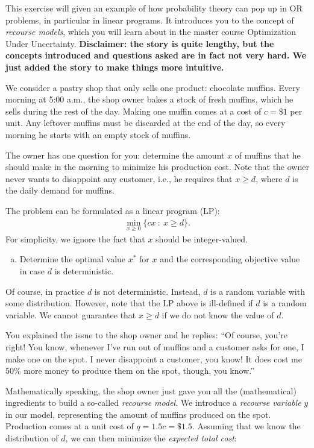 \documentclass[assignments]{subfiles}
\begin{document}
\begin{exercise}

This exercise will given an example of how probability theory can pop up in OR problems, in particular in linear programs. It introduces you to the concept of \textit{recourse models}, which you will learn about in the master course Optimization Under Uncertainty. \textbf{Disclaimer: the story is quite lengthy, but the concepts introduced and questions asked are in fact not very hard. We just added the story to make things more intuitive.}

We consider a pastry shop that only sells one product: chocolate muffins. Every morning at 5:00 a.m., the shop owner bakes a stock of fresh muffins, which he sells during the rest of the day. Making one muffin comes at a cost of $c = \$ 1$ per unit. Any leftover muffins must be discarded at the end of the day, so every morning he starts with an empty stock of muffins.

The owner has one question for you: determine the amount $x$ of muffins that he should make in the morning to minimize his production cost. Note that the owner never wants to disappoint any customer, i.e., he requires that $x \geq d$, where $d$ is the daily demand for muffins.

The problem can be formulated as a linear program (LP):
\begin{align}
    \min_{x \geq 0} \{ cx \ : \ x \geq d \}.
\end{align}
For simplicity, we ignore the fact that $x$ should be integer-valued.

\begin{enumerate}[(a)]
    \item Determine the optimal value $x^*$ for $x$ and the corresponding objective value in case $d$ is deterministic.
\end{enumerate}

Of course, in practice $d$ is not deterministic. Instead, $d$ is a random variable with some distribution. However, note that the LP above is ill-defined if $d$ is a random variable. We cannot guarantee that $x \geq d$ if we do not know the value of $d$. 

You explained the issue to the shop owner and he replies: ``Of course, you're right! You know, whenever I've run out of muffins and a customer asks for one, I make one on the spot. I never disappoint a customer, you know! It does cost me $50 \%$ more money to produce them on the spot, though, you know.''

Mathematically speaking, the shop owner just gave you all the (mathematical) ingredients to build a so-called \textit{recourse model}. We introduce a \textit{recourse variable} $y$ in our model, representing the amount of muffins produced on the spot. Production comes at a unit cost of $q = 1.5 c = \$ 1.5$. Assuming that we know the distribution of $d$, we can then minimize the \textit{expected total cost}:


\end{exercise}
\end{document}
